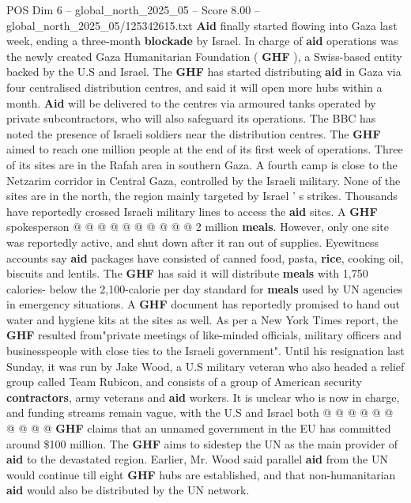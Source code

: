 \begin{textsample}{POS Dim 6 – global\_north\_2025\_05 – Score 8.00 – global\_north\_2025\_05/125342615.txt}  \label{ex:f6_pos_070}
\textbf{Aid} finally started flowing into Gaza last week, ending a three-month \textbf{blockade} by Israel.
In charge of \textbf{aid} operations was the newly created Gaza Humanitarian Foundation ( \textbf{GHF} ), a Swiss-based entity backed by the U.S and Israel.
The \textbf{GHF} has started distributing \textbf{aid} in Gaza via four centralised distribution centres, and said it will open more hubs within a month. \textbf{Aid} will be delivered to the centres via armoured tanks operated by private subcontractors, who will also safeguard its operations.
The BBC has noted the presence of Israeli soldiers near the distribution centres.
The \textbf{GHF} aimed to reach one million people at the end of its first week of operations.
Three of its sites are in the Rafah area in southern Gaza.
A fourth camp is close to the Netzarim corridor in Central Gaza, controlled by the Israeli military.
None of the sites are in the north, the region mainly targeted by Israel ' s strikes.
Thousands have reportedly crossed Israeli military lines to access the \textbf{aid} sites.
A \textbf{GHF} spokesperson @ @ @ @ @ @ @ @ @ @ 2 million \textbf{meals}.
However, only one site was reportedly active, and shut down after it ran out of supplies.
Eyewitness accounts say \textbf{aid} packages have consisted of canned food, pasta, \textbf{rice}, cooking oil, biscuits and lentils.
The \textbf{GHF} has said it will distribute \textbf{meals} with 1,750 calories- below the 2,100-calorie per day standard for \textbf{meals} used by UN agencies in emergency situations.
A \textbf{GHF} document has reportedly promised to hand out water and hygiene kits at the sites as well.
As per a New York Times report, the \textbf{GHF} resulted from"private meetings of like-minded officials, military officers and businesspeople with close ties to the Israeli government".
Until his resignation last Sunday, it was run by Jake Wood, a U.S military veteran who also headed a relief group called Team Rubicon, and consists of a group of American security \textbf{contractors}, army veterans and \textbf{aid} workers.
It is unclear who is now in charge, and funding streams remain vague, with the U.S and Israel both @ @ @ @ @ @ @ @ @ @ \textbf{GHF} claims that an unnamed government in the EU has committed around \$100 million.
The \textbf{GHF} aims to sidestep the UN as the main provider of \textbf{aid} to the devastated region.
Earlier, Mr.
Wood said parallel \textbf{aid} from the UN would continue till eight \textbf{GHF} hubs are established, and that non-humanitarian \textbf{aid} would also be distributed by the UN network.

\end{textsample}
